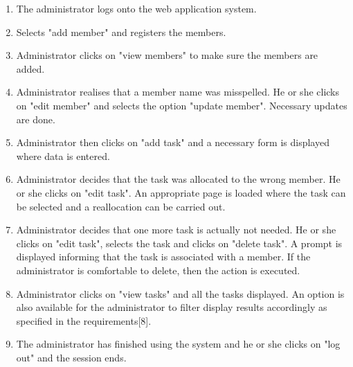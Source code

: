 \documentclass{project}
\begin{document}
\begin{enumerate}
	\item The administrator logs onto the web application system.
	\item Selects "add member" and registers the members.
	\item Administrator clicks on "view members" to make sure the members are added.
	\item Administrator realises that a member name was misspelled. He or she clicks on "edit member" and selects the option "update member".  Necessary updates are done.
	\item Administrator then clicks on "add task" and a necessary form is displayed where data is entered.
	\item Administrator decides that the task was allocated to the wrong member.  He or she clicks on "edit task".  An appropriate page is loaded where the task can be selected and a reallocation can be carried out.
	\item Administrator decides that one more task is actually not needed.  He or she clicks on "edit task", selects the task and clicks on "delete task".  A prompt is displayed informing that the task is associated with a member.  If the administrator is comfortable to delete, then the action is executed.
	\item Administrator clicks on "view tasks" and all the tasks displayed.  An option is also available for the administrator to filter display results accordingly as specified in the requirements[8].
	\item The administrator has finished using the system and he or she clicks on "log out" and the session ends.
\end{enumerate}
\end{document}
